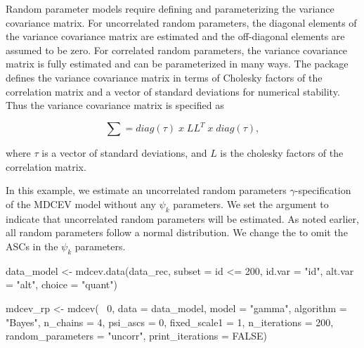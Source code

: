 Random parameter models require defining and parameterizing the variance
covariance matrix. For uncorrelated random parameters, the diagonal
elements of the variance covariance matrix are estimated and the
off-diagonal elements are assumed to be zero. For correlated random
parameters, the variance covariance matrix is fully estimated and can be
parameterized in many ways. The  package defines the
variance covariance matrix in terms of Cholesky factors of the
correlation matrix and a vector of standard deviations for numerical
stability. Thus the variance covariance matrix is specified as

\begin{equation}
\sum = diag(\tau) \; x \; LL^T \; x \; diag(\tau),
\end{equation}

where \(\tau\) is a vector of standard deviations, and \(L\) is the
cholesky factors of the correlation matrix.

In this example, we estimate an uncorrelated random parameters
\(\gamma\)-specification of the MDCEV model without any \(\psi_k\)
parameters. We set the argument  to
indicate that uncorrelated random parameters will be estimated. As noted
earlier, all random parameters follow a normal distribution. We change
the  to omit the ASCs in the \(\psi_k\) parameters.

\begin{example}
data_model <- mdcev.data(data_rec, subset = id <= 200,
                       id.var = "id",
                       alt.var = "alt",
                       choice = "quant") 

mdcev_rp <- mdcev(~ 0,
                    data = data_model,
                    model = "gamma",
                    algorithm = "Bayes",
                    n_chains = 4,
                    psi_ascs = 0,
                    fixed_scale1 = 1,
                    n_iterations = 200,
                    random_parameters = "uncorr",
                    print_iterations = FALSE)
\end{example}

